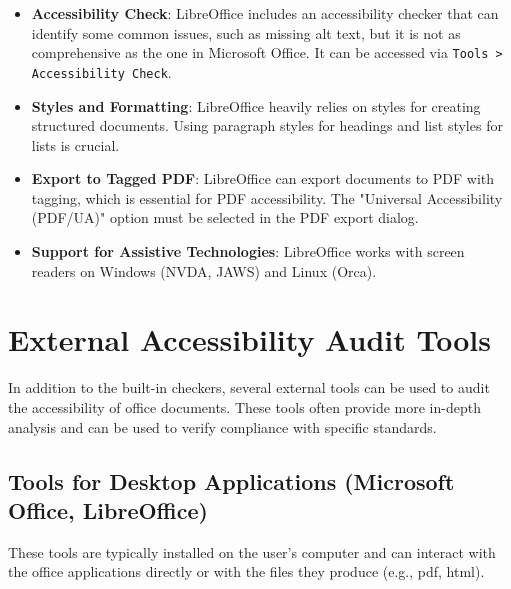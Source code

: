 \begin{itemize}
	\item \textbf{Accessibility Check}: LibreOffice includes an accessibility checker that can identify some common issues, such as missing alt text, but it is not as comprehensive as the one in Microsoft Office. It can be accessed via \texttt{Tools > Accessibility Check}.
	\item \textbf{Styles and Formatting}: LibreOffice heavily relies on styles for creating structured documents. Using paragraph styles for headings and list styles for lists is crucial.
	\item \textbf{Export to Tagged PDF}: LibreOffice can export documents to PDF with tagging, which is essential for PDF accessibility. The "Universal Accessibility (PDF/UA)" option must be selected in the PDF export dialog.
	\item \textbf{Support for Assistive Technologies}: LibreOffice works with screen readers on Windows (NVDA, JAWS) and Linux (Orca).
\end{itemize}

\section{External Accessibility Audit Tools}
\label{sec:external-audit-tools}

In addition to the built-in checkers, several external tools can be used to audit the accessibility of office documents. These tools often provide more in-depth analysis and can be used to verify compliance with specific standards.

\subsection{Tools for Desktop Applications (Microsoft Office, LibreOffice)}
\label{subsec:desktop-audit-tools}

These tools are typically installed on the user's computer and can interact with the office applications directly or with the files they produce (e.g., \gls{pdf}, \gls{html}).

